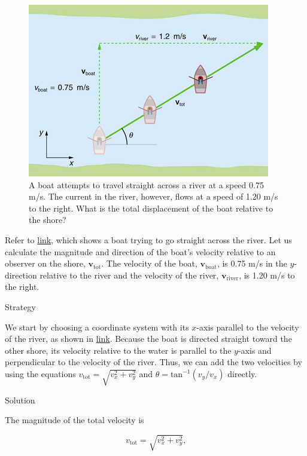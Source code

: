 \documentclass[
]{book}
\begin{document}
\begin{figure}
\hypertarget{import-auto-id2070798}{%
\centering
\includegraphics{images/Figure_03_05_09a.jpg}
\caption{A boat attempts to travel straight across a river at a speed 0.75 m/s.
The current in the river, however, flows at a speed of 1.20 m/s to the
right. What is the total displacement of the boat relative to the
shore?}\label{import-auto-id2070798}
}
\end{figure}

Refer to \protect\hyperlink{import-auto-id2070798}{link}, which
shows a boat trying to go straight across the river. Let us calculate
the magnitude and direction of the boat's velocity relative to an
observer on the shore, \(\textbf{v}_{\text{tot}}{}\). The velocity of the
boat, \(\textbf{v}_{\text{boat}}{}\), is 0.75 m/s in the \(y{}\)-direction
relative to the river and the velocity of the river,
\(\textbf{v}_{\text{river}}{}\), is 1.20 m/s to the right.

{Strategy}

We start by choosing a coordinate system with its \(x\)-axis parallel to
the velocity of the river, as shown in
\protect\hyperlink{import-auto-id2070798}{link}. Because the boat
is directed straight toward the other shore, its velocity relative to
the water is parallel to the \(y\)-axis and perpendicular to the velocity
of the river. Thus, we can add the two velocities by using the equations
\({v_{\text{tot}} = \sqrt{v_{x}^{2} + v_{y}^{2}}}{}\) and
\({{\theta = \text{tan}^{- 1}}({v_{y}/v_{x}})}{}\) directly.

{Solution}

The magnitude of the total velocity is

\leavevmode{}%
\[{{v_{\text{tot}} = \sqrt{v_{x}^{2} + v_{y}^{2}}}\text{,}}{}\]
\end{document}
